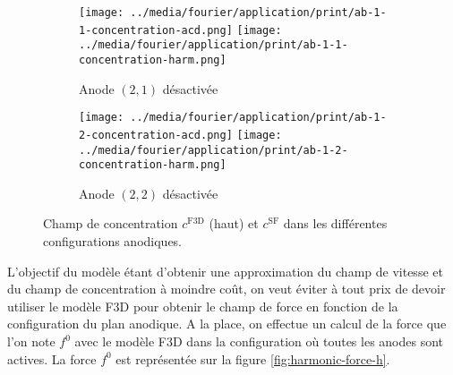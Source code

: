 \begin{figure}
  \begin{center}
    \begin{subfigure}[t]{\textwidth}
      \begin{center}
        \texttt{[image: ../media/fourier/application/print/ab-1-1-concentration-acd.png]}
        \texttt{[image: ../media/fourier/application/print/ab-1-1-concentration-harm.png]}
        \caption{Anode $(2,1)$ désactivée}
        \label{fig:}
      \end{center}
    \end{subfigure}

    \begin{subfigure}[t]{\textwidth}
      \begin{center}
        \texttt{[image: ../media/fourier/application/print/ab-1-2-concentration-acd.png]}
        \texttt{[image: ../media/fourier/application/print/ab-1-2-concentration-harm.png]}
        \caption{Anode $(2,2)$ désactivée}
        \label{fig:}
      \end{center}
    \end{subfigure}


    \caption{Champ de concentration $c^\mathrm{F3D}$ (haut) et
      $c^\mathrm{SF}$ dans les différentes configurations anodiques.}
    \label{fig:harmonic-concentration-comp}
  \end{center}
\end{figure}


L'objectif du modèle étant d'obtenir une approximation du champ de
vitesse et du champ de concentration à moindre coût, on veut
éviter à tout prix de devoir utiliser le modèle F3D pour obtenir
le champ de force en fonction de la configuration du plan anodique. A
la place, on effectue un calcul de la force que l'on note $f^0$ avec
le modèle F3D dans la configuration où toutes les anodes sont
actives. La force $f^0$ est représentée sur la figure \ref{fig:harmonic-force-h}.

